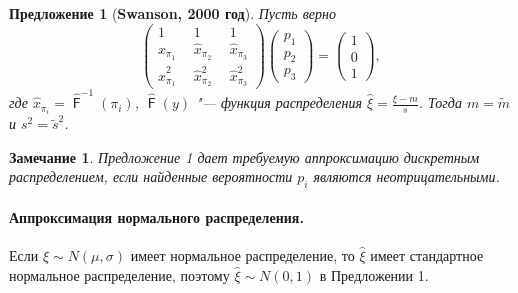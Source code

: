 \documentclass[specialist, substylefile = spbu.rtx,
subf,href,colorlinks=true, 12pt]{disser}
\newtheorem{proposition}[theorem]{Предложение}
\newtheorem{zam}{Замечание}
\DeclareMathOperator{\F}{\mathsf{F}}
\begin{document}
\begin{proposition}[\textbf{Swanson, 2000 год}]\label{pr1}
	Пусть верно 
	\begin{equation}
		\begin{pmatrix} 
			1&1&1\\ 
			\hat{x}_{\pi_{1}}~~ &  \hat{x}_{\pi_{2}}~~  & \hat{x}_{\pi_{3}} \\ 
			\hat{x}_{\pi_{1}}^{2}~~&\hat{x}_{\pi_{2}}^{2}~~  &\hat{x}_{\pi_{3}}^{2}
		\end{pmatrix}
		\begin{pmatrix}p_{1}\\p_{2}\\ p_{3}\end{pmatrix}= \begin{pmatrix}1\\0\\1 \end{pmatrix},\label{2}
	\end{equation}
	где $\hat{x}_{\pi_{i}} = \hat{\F}^{-1}(\pi_{i})$, $\hat{\F}(y)$ "--- функция распределения $\displaystyle{\hat{\xi} = \frac{\xi-m}{s}}$. Тогда $m=\tilde{m}$ и $s^{2} = \tilde{s}^{2}$.
\end{proposition}

\begin{zam}
	Предложение 1 дает требуемую аппроксимацию дискретным распределением, если найденные вероятности $p_{i}$ являются неотрицательными.
\end{zam}

\paragraph{Аппроксимация нормального распределения.}
Если $\xi\sim N(\mu, \sigma)$ имеет нормальное распределение, то
$\hat{\xi}$ имеет стандартное нормальное распределение, поэтому $\hat{\xi}\sim N(0, 1)$ в Предложении 1.
\end{document}
